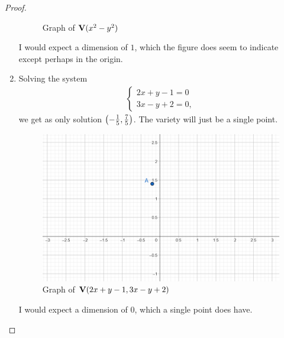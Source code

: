 \begin{proof}
\begin{enumerate}
\begin{figure}[H]
            \caption{Graph of $\mathbf{V}(x^2 - y^2)$}
            \label{fig:sec1-2-ex1b}
        \end{figure}
        I would expect a dimension of $1$, which the figure does seem to indicate except perhaps in the origin.
        \item Solving the system
        \begin{align*}
            \left\{\begin{array}{l}
            2x + y - 1 = 0\\
            3x - y + 2 = 0,
        \end{array}\right.
        \end{align*}
        we get as only solution $\left( -\frac{1}{5},\frac{7}{5}\right)$. 
        The variety will just be a single point.
        \begin{figure}[H]
            \centering
            \includegraphics[width=0.5\linewidth]{cox-little-oshea/assets/sec1-2-ex1c.png}
            \caption{Graph of $\mathbf{V}(2x+y-1, 3x - y + 2)$}
            \label{fig:sec1-2-ex1c}
        \end{figure}
        I would expect a dimension of $0$, which a single point does have.
    \end{enumerate}
\end{proof}


